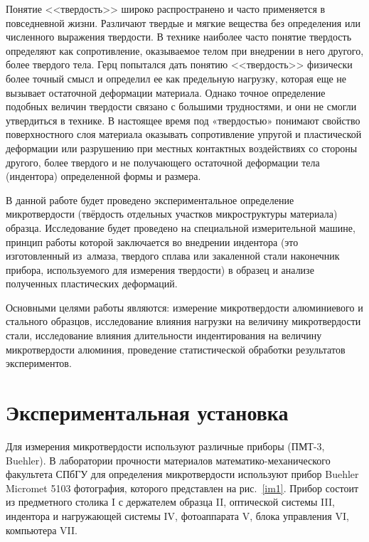 \documentclass[12pt, a4paper]{article}
\begin{document}
    Понятие <<твердость>> широко распространено и часто применяется в повседневной жизни. Различают твердые и мягкие вещества без определения или численного выражения твердости. В технике наиболее часто понятие твердость определяют как сопротивление, оказываемое телом при внедрении в него другого, более твердого тела. Герц попытался дать понятию <<твердость>> физически более точный смысл и определил ее как предельную нагрузку, которая еще не вызывает остаточной деформации материала. Однако точное определение подобных величин твердости связано с большими трудностями, и они не смогли утвердиться в технике. В настоящее время под «твердостью» понимают свойство поверхностного слоя материала оказывать сопротивление упругой и пластической деформации или разрушению при местных контактных воздействиях со стороны другого, более твердого и не получающего остаточной деформации тела (индентора) определенной формы и размера.
    
    В данной работе будет проведено экспериментальное определение микротвердости (твёрдость отдельных участков микроструктуры материала) образца. Исследование будет проведено на специальной измерительной машине, принцип работы которой заключается во внедрении индентора (это изготовленный из алмаза, твердого сплава или закаленной стали наконечник прибора, используемого для измерения твердости) в образец и анализе полученных пластических деформаций.
    
    Основными целями работы являются: измерение микротвердости алюминиевого и стального образцов, исследование влияния нагрузки на величину микротвердости стали, исследование влияния длительности индентирования на величину микротвердости алюминия, проведение статистической обработки результатов экспериментов.
    
    \newpage
    
    \section{Экспериментальная установка}
    
    Для измерения микротвердости используют различные приборы (ПМТ-3, Buehler). В лаборатории прочности материалов математико-механического факультета СПбГУ для определения микротвердости используют прибор  Buehler Micromet 5103 фотография, которого представлен на рис.~\ref{im1}. Прибор состоит из предметного столика I с держателем образца II, оптической системы III, индентора и нагружающей системы IV, фотоаппарата V, блока управления VI, компьютера VII.
    
\end{document}
